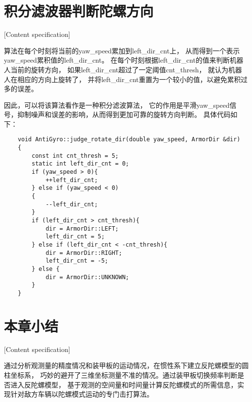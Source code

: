 \section{积分滤波器判断陀螺方向}[Content specification]

算法在每个时刻将当前的yaw\_speed累加到left\_dir\_cnt上，
从而得到一个表示yaw\_speed累积值的left\_dir\_cnt。
在每个时刻根据left\_dir\_cnt的值来判断机器人当前的旋转方向，
如果left\_dir\_cnt超过了一定阈值cnt\_thresh，
就认为机器人在相应的方向上旋转了，
并将left\_dir\_cnt重置为一个较小的值，以避免累积过多的误差。

因此，可以将该算法看作是一种积分滤波算法，
它的作用是平滑yaw\_speed信号，抑制噪声和误差的影响，从而得到更加可靠的旋转方向判断。
具体代码如下：

\begin{lstlisting}
    void AntiGyro::judge_rotate_dir(double yaw_speed, ArmorDir &dir)
    {
        const int cnt_thresh = 5;
        static int left_dir_cnt = 0;
        if (yaw_speed > 0){
            ++left_dir_cnt;
        } else if (yaw_speed < 0)
        {
            --left_dir_cnt;
        } 
        if (left_dir_cnt > cnt_thresh){
            dir = ArmorDir::LEFT;
            left_dir_cnt = 5;
        } else if (left_dir_cnt < -cnt_thresh){    
            dir = ArmorDir::RIGHT;
            left_dir_cnt = -5;
        } else {
            dir = ArmorDir::UNKNOWN;
        }
    }
\end{lstlisting}


\section{本章小结}[Content specification]

通过分析观测量的精度情况和装甲板的运动情况，在惯性系下建立反陀螺模型的圆柱坐标系，
巧妙的避开了三维坐标测量不准的情况。通过装甲板切换频率判断是否进入反陀螺模型，
基于观测的空间量和时间量计算反陀螺模式的所需信息，实现针对敌方车辆以陀螺模式运动的专门击打算法。
